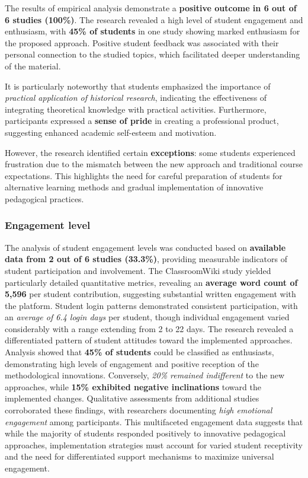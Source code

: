 \documentclass[
hf,
]{ceurart}
\begin{document}
The results of empirical analysis demonstrate a \textbf{positive outcome in 6 out of 6 studies (100\%)}. The research revealed a high level of student engagement and enthusiasm, with \textbf{45\% of students} in one study showing marked enthusiasm for the proposed approach. Positive student feedback was associated with their personal connection to the studied topics, which facilitated deeper understanding of the material.

It is particularly noteworthy that students emphasized the importance of \textit{practical application of historical research}, indicating the effectiveness of integrating theoretical knowledge with practical activities. Furthermore, participants expressed a \textbf{sense of pride} in creating a professional product, suggesting enhanced academic self-esteem and motivation.

However, the research identified certain \textbf{exceptions}: some students experienced frustration due to the mismatch between the new approach and traditional course expectations. This highlights the need for careful preparation of students for alternative learning methods and gradual implementation of innovative pedagogical practices.

\subsubsection{Engagement level}
The analysis of student engagement levels was conducted based on \textbf{available data from 2 out of 6 studies (33.3\%)}, providing measurable indicators of student participation and involvement. The ClassroomWiki study yielded particularly detailed quantitative metrics, revealing an \textbf{average word count of 5,596} per student contribution, suggesting substantial written engagement with the platform. Student login patterns demonstrated consistent participation, with an \textit{average of 6.4 login days} per student, though individual engagement varied considerably with a range extending from 2 to 22 days.
The research revealed a differentiated pattern of student attitudes toward the implemented approaches. Analysis showed that \textbf{45\% of students} could be classified as enthusiasts, demonstrating high levels of engagement and positive reception of the methodological innovations. Conversely, \textit{20\% remained indifferent} to the new approaches, while \textbf{15\% exhibited negative inclinations} toward the implemented changes.
Qualitative assessments from additional studies corroborated these findings, with researchers documenting \textit{high emotional engagement} among participants. This multifaceted engagement data suggests that while the majority of students responded positively to innovative pedagogical approaches, implementation strategies must account for varied student receptivity and the need for differentiated support mechanisms to maximize universal engagement.
\end{document}
